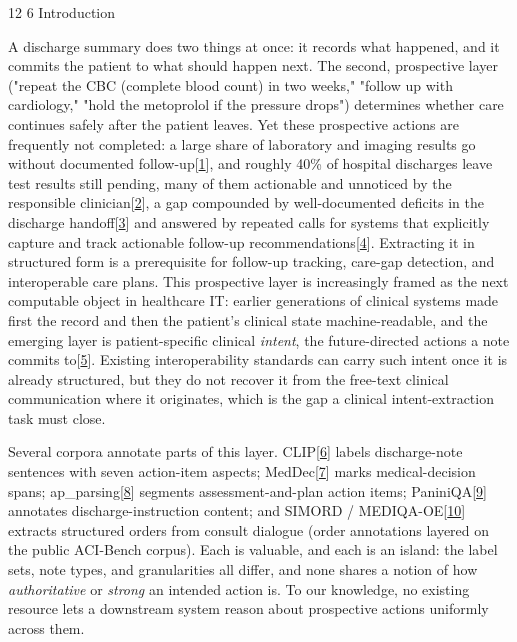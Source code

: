 \documentclass[3p,twocolumn]{elsarticle}
\makeatletter
\renewcommand\section{\@startsection {section}{1}{\z@}%
    {12\p@ \@plus 4\p@ \@minus 4\p@}%
    {6\p@ \@plus 4\p@ \@minus 3\p@}%
    {\normalsize\bfseries\boldmath}}
\makeatother
\begin{document}
\section{Introduction}\label{introduction}

A discharge summary does two things at once: it records what happened, and it commits the patient to what should happen next. The second, prospective layer ("repeat the CBC (complete blood count) in two weeks," "follow up with cardiology," "hold the metoprolol if the pressure drops") determines whether care continues safely after the patient leaves. Yet these prospective actions are frequently not completed: a large share of laboratory and imaging results go without documented follow-up{[}\hyperref[r1]{1}{]}, and roughly 40\% of hospital discharges leave test results still pending, many of them actionable and unnoticed by the responsible clinician{[}\hyperref[r2]{2}{]}, a gap compounded by well-documented deficits in the discharge handoff{[}\hyperref[r3]{3}{]} and answered by repeated calls for systems that explicitly capture and track actionable follow-up recommendations{[}\hyperref[r4]{4}{]}. Extracting it in structured form is a prerequisite for follow-up tracking, care-gap detection, and interoperable care plans. This prospective layer is increasingly framed as the next computable object in healthcare IT: earlier generations of clinical systems made first the record and then the patient's clinical state machine-readable, and the emerging layer is patient-specific clinical \emph{intent}, the future-directed actions a note commits to{[}\hyperref[r5]{5}{]}. Existing interoperability standards can carry such intent once it is already structured, but they do not recover it from the free-text clinical communication where it originates, which is the gap a clinical intent-extraction task must close.

Several corpora annotate parts of this layer. CLIP{[}\hyperref[r6]{6}{]} labels discharge-note sentences with seven action-item aspects; MedDec{[}\hyperref[r7]{7}{]} marks medical-decision spans; ap\_parsing{[}\hyperref[r8]{8}{]} segments assessment-and-plan action items; PaniniQA{[}\hyperref[r9]{9}{]} annotates discharge-instruction content; and SIMORD / MEDIQA-OE{[}\hyperref[r10]{10}{]} extracts structured orders from consult dialogue (order annotations layered on the public ACI-Bench corpus). Each is valuable, and each is an island: the label sets, note types, and granularities all differ, and none shares a notion of how \emph{authoritative} or \emph{strong} an intended action is. To our knowledge, no existing resource lets a downstream system reason about prospective actions uniformly across them.
\end{document}
